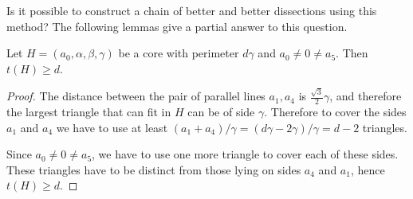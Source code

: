 Is it possible to construct a chain of better and better dissections using this method? The following lemmas give a partial answer to this question.

\begin{lem}
Let $H = (a_0, \alpha, \beta, \gamma)$ be a core with perimeter $d\gamma$ and $a_0 \ne 0 \ne a_5$. Then $t(H) \geq d$.
\end{lem}
\begin{proof}
The distance between the pair of parallel lines $a_1, a_4$ is $\frac{\sqrt{3}}{2}\gamma$, and therefore the largest triangle that can fit in $H$ can be of side $\gamma$. Therefore to cover the sides $a_1$ and $a_4$ we have to use at least $(a_1+a_4)/\gamma = (d\gamma-2\gamma)/\gamma = d-2$ triangles.

Since $a_0 \ne 0 \ne a_5$, we have to use one more triangle to cover each of these sides. These triangles have to be distinct from those lying on sides $a_4$ and $a_1$, hence $t(H) \geq d$.

\end{proof}

\begin{thm}
\end{thm}%






